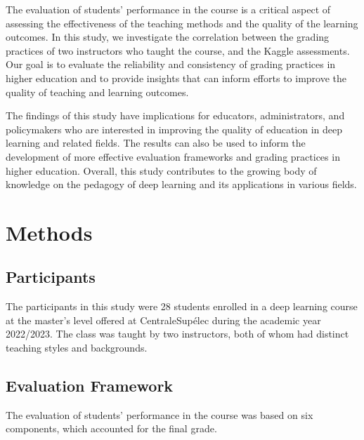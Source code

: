\documentclass[a4paper]{article}
\begin{document}
The evaluation of students' performance in the course is a critical aspect of assessing the effectiveness of the teaching methods and the quality of the learning outcomes.
In this study, we investigate the correlation between the grading practices of two instructors who taught the course, and the Kaggle assessments.
Our goal is to evaluate the reliability and consistency of grading practices in higher education and to provide insights that can inform efforts to improve the quality of teaching and learning outcomes.

The findings of this study have implications for educators, administrators, and policymakers who are interested in improving the quality of education in deep learning and related fields.
The results can also be used to inform the development of more effective evaluation frameworks and grading practices in higher education.
Overall, this study contributes to the growing body of knowledge on the pedagogy of deep learning and its applications in various fields.



\section{Methods}
\subsection{Participants}
The participants in this study were 28 students enrolled in a deep learning course at the master's level offered at CentraleSupélec during the academic year 2022/2023.
The class was taught by two instructors, both of whom had distinct teaching styles and backgrounds.

\subsection{Evaluation Framework}
The evaluation of students' performance in the course was based on six components, which accounted for the final grade.
\end{document}
